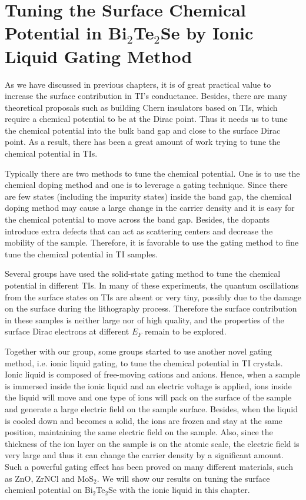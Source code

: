 
\chapter{Tuning the Surface Chemical Potential in Bi$_2$Te$_2$Se by Ionic Liquid Gating Method\label{ch:liquid}}

As we have discussed in previous chapters, it is of great practical value to increase the surface contribution in TI's conductance. Besides, there are many theoretical proposals such as building Chern insulators based on TIs, which require a chemical potential to be at the Dirac point. Thus it needs us to tune the chemical potential into the bulk band gap and close to the surface Dirac point. As a result, there has been a great amount of work trying to tune the chemical potential in TIs\cite{Checkelsky_gating, PabloBi2Se3, SacepeGate, PabloFilm, FuhrerBi2Se3, Checkelsky_liquid, IwasaMBE, Ando_liquid}.

Typically there are two methods to tune the chemical potential. One is to use the chemical doping method and one is to leverage a gating technique. Since there are few states (including the impurity states) inside the band gap, the chemical doping method may cause a large change in the carrier density and it is easy for the chemical potential to move across the band gap. Besides, the dopants introduce extra defects that can act as scattering centers and decrease the mobility of the sample. Therefore, it is favorable to use the gating method to fine tune the chemical potential in TI samples. 

Several groups\cite{Checkelsky_gating, PabloBi2Se3, SacepeGate, PabloFilm} have used the solid-state gating method to tune the chemical potential in different TIs. In many of these experiments, the quantum oscillations from the surface states on TIs are absent or very tiny, possibly due to the damage on the surface during the lithography process. Therefore the surface contribution in these samples is neither large nor of high quality, and the properties of the surface Dirac electrons at different $E_F$ remain to be explored.

Together with our group, some groups\cite{Yuan2011, FuhrerBi2Se3, Checkelsky_liquid, IwasaMBE, Ando_liquid} started to use another novel gating method, i.e. ionic liquid gating, to tune the chemical potential in TI crystals. Ionic liquid is composed of free-moving cations and anions. Hence, when a sample is immersed inside the ionic liquid and an electric voltage is applied, ions inside the liquid will move and one type of ions will pack on the surface of the sample and generate a large electric field on the sample surface. Besides, when the liquid is cooled down and becomes a solid, the ions are frozen and stay at the same position, maintaining the same electric field on the sample. Also, since the thickness of the ion layer on the sample is on the atomic scale, the electric field is very large and thus it can change the carrier density by a significant amount. Such a powerful gating effect has been proved on many different materials, such as ZnO\cite{yuan2009ZnO}, ZrNCl\cite{ye2010liquid} and MoS$_2$\cite{YeMoS2}. We will show our results on tuning the surface chemical potential on Bi$_2$Te$_2$Se with the ionic liquid in this chapter.

